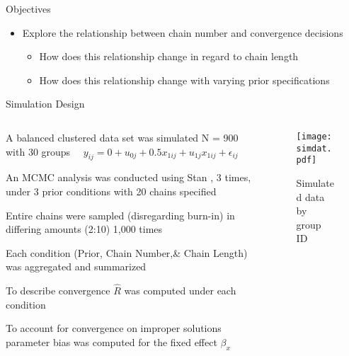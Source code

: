 \documentclass[final,hyperref={pdfpagelabels=false}]{beamer}
\begin{document}
\begin{frame}[t]
\begin{columns}[t]
\begin{column}{.465\textwidth}
\begin{block}{Objectives}
\begin{itemize}
\item Explore the relationship between chain number and convergence decisions
\begin{itemize}
	\item How does this relationship change in regard to chain length
	\item How does this relationship change with varying prior specifications
\end{itemize}
\end{itemize}

\end{block}


\begin{block}{Simulation Design}

\begin{columns} %
\begin{column}{.56\textwidth} %
\begin{enumerate}\small{
\item A balanced clustered data set was simulated N = 900 with 30 groups $\quad y_{ij} = 0 + u_{0j} + 0.5x_{1ij}  +u_{1j}x_{1ij} + \epsilon_{ij}$
\item An MCMC analysis was conducted using Stan \cite{carpenter2017stan}, 3 times, under 3 prior conditions with 20 chains specified 
\item Entire chains were sampled (disregarding burn-in) in differing amounts (2:10) 1,000 times
\item Each condition (Prior, Chain Number,\& Chain Length) was aggregated and summarized}
\end{enumerate}


\begin{itemize}
\small{
	\item To describe convergence $\hat{R}$ was computed under each condition
	\item To account for convergence on improper solutions parameter bias was computed for the fixed effect $\beta_{x}$}
\end{itemize}
\end{column}


\begin{column}{.43\textwidth} %
\centering
\begin{figure}
\texttt{[image: simdat.pdf]}
\tiny{\caption{Simulated data by group ID}}
\end{figure}
\end{column}
\end{columns} %



\end{block}
\end{column}
\end{columns}
\end{frame}
\end{document}
